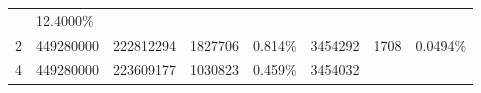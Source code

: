 \documentclass[11pt]{article}
\begin{document}
\begin{longtable}[]{@{}llllllll@{}}
\begin{minipage}[t]{0.10\columnwidth}
\end{minipage} & \begin{minipage}[t]{0.10\columnwidth}\raggedright\strut
12.4000\%\strut
\end{minipage}\tabularnewline
\begin{minipage}[t]{0.14\columnwidth}\raggedright\strut
2\strut
\end{minipage} & \begin{minipage}[t]{0.10\columnwidth}\raggedright\strut
449280000\strut
\end{minipage} & \begin{minipage}[t]{0.08\columnwidth}\raggedright\strut
222812294\strut
\end{minipage} & \begin{minipage}[t]{0.09\columnwidth}\raggedright\strut
1827706\strut
\end{minipage} & \begin{minipage}[t]{0.09\columnwidth}\raggedright\strut
0.814\%\strut
\end{minipage} & \begin{minipage}[t]{0.08\columnwidth}\raggedright\strut
3454292\strut
\end{minipage} & \begin{minipage}[t]{0.10\columnwidth}\raggedright\strut
1708\strut
\end{minipage} & \begin{minipage}[t]{0.10\columnwidth}\raggedright\strut
0.0494\%\strut
\end{minipage}\tabularnewline
\begin{minipage}[t]{0.14\columnwidth}\raggedright\strut
4\strut
\end{minipage} & \begin{minipage}[t]{0.10\columnwidth}\raggedright\strut
449280000\strut
\end{minipage} & \begin{minipage}[t]{0.08\columnwidth}\raggedright\strut
223609177\strut
\end{minipage} & \begin{minipage}[t]{0.09\columnwidth}\raggedright\strut
1030823\strut
\end{minipage} & \begin{minipage}[t]{0.09\columnwidth}\raggedright\strut
0.459\%\strut
\end{minipage} & \begin{minipage}[t]{0.08\columnwidth}\raggedright\strut
3454032\strut
\end{minipage} & \begin{minipage}[t]{0.10\columnwidth}\raggedright\strut

\end{minipage}
\end{longtable}
\end{document}

